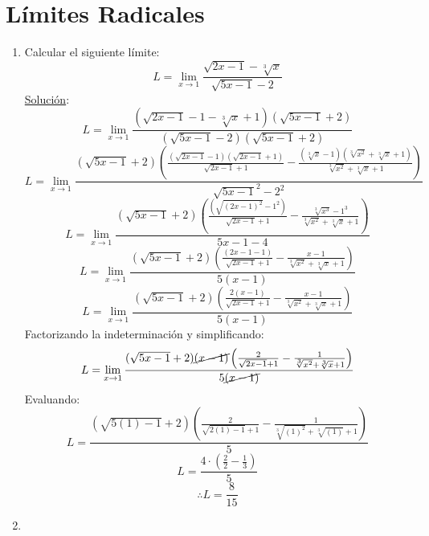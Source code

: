 \section{Límites Radicales}
\begin{enumerate}
\item Calcular el siguiente límite:
\[ L=\lim_{x \to 1} \frac{\sqrt{2x-1}-\sqrt[3]{x}}{\sqrt{5x-1}-2}\]
\underline{Solución}:
\[L=\lim_{x \to 1} \frac{(\sqrt{2x-1}-1-\sqrt[3]{x}+1)(\sqrt{5x-1}+2)}{(\sqrt{5x-1}-2)(\sqrt{5x-1}+2)}\]
\[L=\lim_{x \to 1} \frac{(\sqrt{5x-1}+2) \left(\frac{(\sqrt{2x-1}-1)(\sqrt{2x-1}+1)}{\sqrt{2x-1}+1}-\frac{(\sqrt[3]{x}-1)(\sqrt[3]{x^2}+\sqrt[3]{x}+1)}{\sqrt[3]{x^2}+\sqrt[3]{x}+1}\right)}{\sqrt{5x-1}^2-2^2}\]
\[L=\lim_{x \to 1} \frac{(\sqrt{5x-1}+2)\left(\frac{(\sqrt{(2x-1)^2}-1^2)}{\sqrt{2x-1}+1}-\frac{\sqrt[3]{x^3}-1^3}{\sqrt[3]{x^2}+\sqrt[3]{x}+1}\right)}{5x-1-4}\]
\[L=\lim_{x \to 1} \frac{(\sqrt{5x-1}+2)\left(\frac{(2x-1-1)}{\sqrt{2x-1}+1}-\frac{x-1}{\sqrt[3]{x^2}+\sqrt[3]{x}+1}\right)}{5(x-1)}\]
\[L=\lim_{x \to 1} \frac{(\sqrt{5x-1}+2)\left(\frac{2(x-1)}{\sqrt{2x-1}+1}-\frac{x-1}{\sqrt[3]{x^2}+\sqrt[3]{x}+1}\right)}{5(x-1)}\]
Factorizando la indeterminación y simplificando:
\[L=\lim_{x \to 1} \frac{(\sqrt{5x-1}+2) \cancel{(x-1)}\left(\frac{2}{\sqrt{2x-1}+1}-\frac{1}{\sqrt[3]{x^2}+\sqrt[3]{x}+1}\right)}{5\cancel{(x-1)}}\]
Evaluando:
\[L=\frac{(\sqrt{5(1)-1}+2) \left(\frac{2}{\sqrt{2(1)-1}+1}-\frac{1}{\sqrt[3]{(1)^2}+\sqrt[3]{(1)}+1}\right)}{5}\]
\[L=\frac{4\cdot \left(\frac{2}{2}-\frac{1}{3} \right)}{5}\]
\[ \therefore L=\frac{8}{15} \]
\item
\end{enumerate}